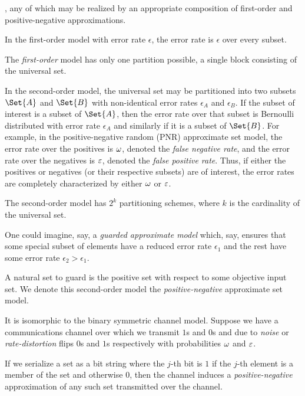 \documentclass[10pt,final,hidelinks]{article}
\numberwithin{equation}{section}
\begin{document}
, any of which may be realized by an appropriate composition of first-order and positive-negative approximations.

\providecommand{\mainx}{..}
In the first-order model with error rate $\epsilon$, the error rate is $\epsilon$ over every subset.


The \emph{first-order} model has only one partition possible, a single block consisting of the universal set.

\providecommand{\mainx}{..}
In the second-order model, the universal set may be partitioned into two subsets $\Set{A}$ and $\Set{B}$ with non-identical error rates $\epsilon_A$ and $\epsilon_B$.
If the subset of interest is a subset of $\Set{A}$, then the error rate over that subset is Bernoulli distributed with error rate $\epsilon_A$ and similarly if it is a subset of $\Set{B}$.
For example, in the positive-negative random (PNR) approximate set model, the error rate over the positives is $\omega$, denoted the \emph{false negative rate}, and the error rate over the negatives is $\varepsilon$, denoted the \emph{false positive rate}.
Thus, if either the positives or negatives (or their respective subsets) are of interest, the error rates are completely characterized by either $\omega$ or $\varepsilon$.




The second-order model has $2^k$ partitioning schemes, where $k$ is the cardinality of the universal set.

One could imagine, say, a \emph{guarded approximate model} which, say, ensures that some special subset of elements have a reduced error rate $\epsilon_1$ and the rest have some error rate $\epsilon_2 > \epsilon_1$.

A natural set to guard is the positive set with respect to some objective input set.
We denote this second-order model the \emph{positive-negative} approximate set model.

It is isomorphic to the binary symmetric channel model.
Suppose we have a communications channel over which we transmit $1$s and $0$s and due to \emph{noise} or \emph{rate-distortion} flips $0$s and $1$s respectively with probabilities $\omega$ and $\varepsilon$.

If we serialize a set as a bit string where the $j$-th bit is $1$ if the $j$-th element is a member of the set and otherwise $0$, then the channel induces a \emph{positive-negative} approximation of any such set transmitted over the channel.
\end{document}
